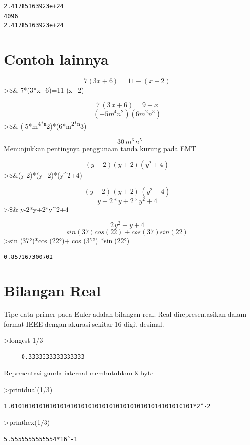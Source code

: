 \documentclass[
]{book}
\begin{document}
\begin{verbatim}
2.41785163923e+24
4096
2.41785163923e+24
\end{verbatim}

\section{Contoh lainnya}\label{contoh-lainnya-1}

\[7(3x+6)=11-(x+2)\]\textgreater\$\& 7*(3*x+6)=11-(x+2)

\[7\,\left(3\,x+6\right)=9-x\]\[(-5m^4n^2)(6m^2n^3)\]\textgreater\$\& (-5*m\textsuperscript{4*n}2)*(6*m\textsuperscript{2*n}3)

\[-30\,m^6\,n^5\]Menunjukkan pentingnya penggunaan tanda kurung pada EMT

\[(y-2)(y+2)(y^2+4)\]\textgreater\$\&(y-2)*(y+2)*(y\^{}2+4)

\[\left(y-2\right)\,\left(y+2\right)\,\left(y^2+4\right)\]\[y-2*y+2*y^2+4\]\textgreater\$\& y-2*y+2*y\^{}2+4

\[2\,y^2-y+4\]\[sin(37)cos(22)+cos(37)sin(22)\]\textgreater sin (37°)*cos (22°)+ cos (37°) *sin (22°)

\begin{verbatim}
0.857167300702
\end{verbatim}

\section{Bilangan Real}\label{bilangan-real}

Tipe data primer pada Euler adalah bilangan real. Real direpresentasikan dalam format IEEE dengan akurasi sekitar 16 digit desimal.

\textgreater longest 1/3

\begin{verbatim}
     0.3333333333333333 
\end{verbatim}

Representasi ganda internal membutuhkan 8 byte.

\textgreater printdual(1/3)

\begin{verbatim}
1.0101010101010101010101010101010101010101010101010101*2^-2
\end{verbatim}

\textgreater printhex(1/3)

\begin{verbatim}
5.5555555555554*16^-1
\end{verbatim}
\end{document}
